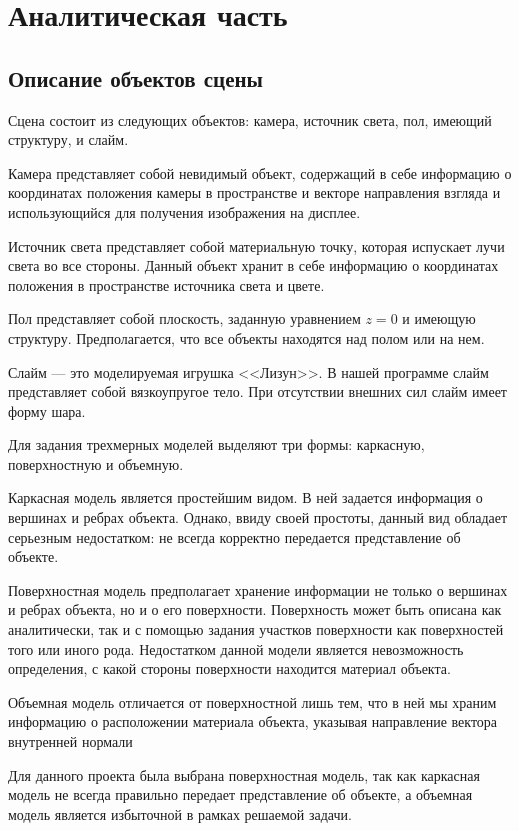 \chapter{Аналитическая часть}

\section{Описание объектов сцены}

Сцена состоит из следующих объектов: камера, источник света, пол, имеющий структуру, и слайм.

Камера представляет собой невидимый объект, содержащий в себе информацию о координатах положения камеры в пространстве и векторе направления взгляда и использующийся для получения изображения на дисплее.

Источник света представляет собой материальную точку, которая испускает лучи света во все стороны. Данный объект хранит в себе информацию о координатах положения в пространстве источника света и цвете.

Пол представляет собой плоскость, заданную уравнением $z = 0$ и имеющую структуру. Предполагается, что все объекты находятся над полом или на нем.

Слайм --- это моделируемая игрушка <<Лизун>>. В нашей программе слайм представляет собой вязкоупругое тело. При отсутствии внешних сил слайм имеет форму шара.

Для задания трехмерных моделей выделяют три формы: каркасную, поверхностную и объемную.

Каркасная модель является простейшим видом. В ней задается информация о вершинах и ребрах объекта. Однако, ввиду своей простоты, данный вид обладает серьезным недостатком: не всегда корректно передается представление об объекте.

Поверхностная модель предполагает хранение информации не только о вершинах и ребрах объекта, но и о его поверхности. Поверхность может быть описана как аналитически, так и с помощью задания участков поверхности как поверхностей того или иного рода. Недостатком данной модели является невозможность определения, с какой стороны поверхности находится материал объекта.

Объемная модель отличается от поверхностной лишь тем, что в ней мы храним информацию о расположении материала объекта, указывая направление вектора внутренней нормали

Для данного проекта была выбрана поверхностная модель, так как каркасная модель не всегда правильно передает представление об объекте, а объемная модель является избыточной в рамках решаемой задачи.

